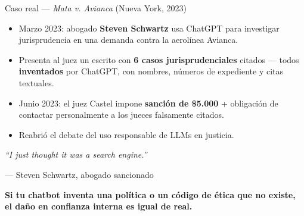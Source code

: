 \documentclass[aspectratio=169, 11pt]{beamer}
\begin{document}
\begin{frame}[shrink]{Caso real --- \textit{Mata v. Avianca} (Nueva York, 2023)}
  \vspace{4pt}
  \begin{itemize}\setlength{\itemsep}{4pt}
    \footnotesize
    \item Marzo 2023: abogado \textbf{Steven Schwartz} usa ChatGPT para investigar
    jurisprudencia en una demanda contra la aerolínea Avianca.
    \item Presenta al juez un escrito con \textbf{6 casos jurisprudenciales} citados ---
    todos \textbf{inventados} por ChatGPT, con nombres, números de expediente y citas textuales.
    \item Junio 2023: el juez Castel impone \textbf{sanción de \$5.000} + obligación de
    contactar personalmente a los jueces falsamente citados.
    \item Reabrió el debate del uso responsable de LLMs en justicia.
  \end{itemize}
  \vspace{6pt}
  \begin{tcolorbox}[colback=arcaDark, colframe=arcaDark, sharp corners,
    boxrule=0pt, left=10pt, right=10pt, top=6pt, bottom=6pt]
    {\footnotesize\color{white}\itshape
    ``I just thought it was a search engine.''\par
    \vspace{2pt}
    \hfill{\scriptsize\normalfont\color{white!75}--- Steven Schwartz, abogado sancionado}}
  \end{tcolorbox}
  \vspace{4pt}
  \begin{tcolorbox}[colback=arcaRed!8, colframe=arcaRed, leftrule=3pt,
    boxrule=0pt, sharp corners, left=8pt, right=8pt, top=3pt, bottom=3pt]
    {\footnotesize\color{arcaDark}\bfseries
    Si tu chatbot inventa una política o un código de ética que no existe,
    el daño en confianza interna es igual de real.}
  \end{tcolorbox}
\end{frame}
\end{document}
